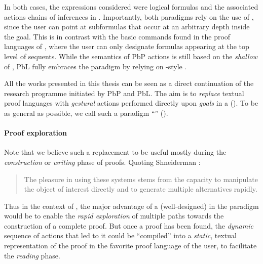 In both cases, the expressions considered were logical formulas and the
associated actions chains of inferences in . Importantly, both paradigms rely
on the use of \emph{}, since the user can point at subformulas
that occur at an arbitrary depth inside the goal. This is in contrast with the
basic commands found in the proof languages of , where the user can only
designate formulas appearing at the top level of sequents. While the
semantics of PbP actions is still based on the \emph{shallow}  of
, PbL fully embraces the  paradigm by relying on
-style .

\begin{emphpar}
  All the works presented in this thesis can be seen as a direct continuation of
  the research programme initiated by PbP and PbL. The aim is to \emph{replace}
  textual proof languages with \emph{gestural} actions performed directly upon
  \emph{goals} in a  (). To be as
  general as possible, we call such a paradigm ``''
  ().
\end{emphpar}

\paragraph{Proof exploration}

Note that we believe such a replacement to be useful mostly during the
\emph{construction} or \emph{writing} phase of proofs. Quoting Shneiderman
\cite{shneiderman_direct_1983}:
\begin{quote}
  The pleasure in using these systems stems from the capacity to manipulate the
object of interest directly and to generate multiple alternatives rapidly.
\end{quote}
Thus in the context of , the major advantage of a (well-designed)  in the
 paradigm would be to enable the \emph{rapid exploration} of multiple paths
towards the construction of a complete proof. But once a proof has been found,
the \emph{dynamic} sequence of actions that led to it could be ``compiled'' into
a \emph{static}, textual representation of the proof in the favorite proof
language of the user, to facilitate the \emph{reading} phase.

